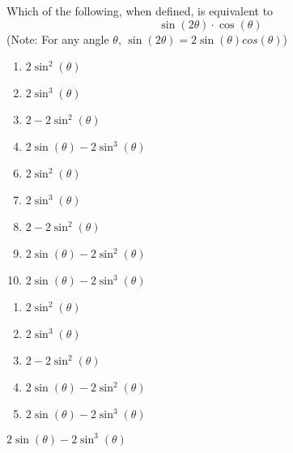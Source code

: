 






  Which of the following, when defined, is equivalent to 
\[\sin(2\theta)\cdot \cos(\theta)\]
(Note: For any angle $\theta$, $\sin(2\theta)=2\sin(\theta)cos(\theta)$)


\ifsat
	\begin{enumerate}[label=\Alph*)]
		\item    $2\sin^{2}(\theta)$
		\item  $2\sin^{3}(\theta)$ 
		\item $2-2\sin^{2}(\theta)$
		\item $2\sin(\theta)-2\sin^{3}(\theta)$ %
	\end{enumerate}
\else
\fi

\ifacteven
	\begin{enumerate}[label=\textbf{\Alph*.},itemsep=\fill,align=left]
		\setcounter{enumii}{5}
		\item    $2\sin^{2}(\theta)$
		\item  $2\sin^{3}(\theta)$ 
		\item $2-2\sin^{2}(\theta)$
		\addtocounter{enumii}{1}
		\item $2\sin(\theta)-2\sin^{2}(\theta)$
		\item $2\sin(\theta)-2\sin^{3}(\theta)$ %
	\end{enumerate}
\else
\fi

\ifactodd
	\begin{enumerate}[label=\textbf{\Alph*.},itemsep=\fill,align=left]
		\item    $2\sin^{2}(\theta)$
		\item  $2\sin^{3}(\theta)$ 
		\item $2-2\sin^{2}(\theta)$
		\item $2\sin(\theta)-2\sin^{2}(\theta)$
		\item $2\sin(\theta)-2\sin^{3}(\theta)$ %
	\end{enumerate}
\else
\fi

\ifgridin
 $2\sin(\theta)-2\sin^{3}(\theta)$ %

\else
\fi

